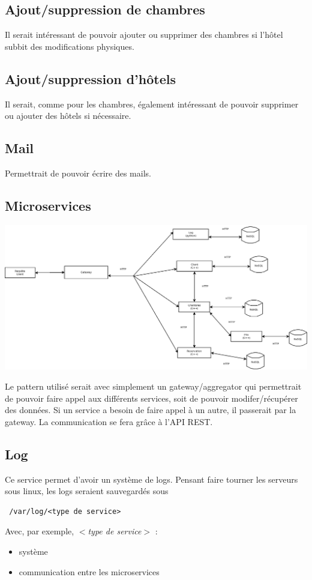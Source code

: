 \documentclass{article}
\begin{document}
\subsection{Ajout/suppression de chambres}
Il serait int\'eressant de pouvoir ajouter ou supprimer des chambres si l'h\^{o}tel subbit des modifications physiques.


\subsection{Ajout/suppression d'h\^{o}tels}
Il serait, comme pour les chambres, \'egalement int\'eressant de pouvoir supprimer ou ajouter des h\^{o}tels si n\'ecessaire.


\subsection{Mail}
Permettrait de pouvoir \'ecrire des mails.

\pagebreak
\begin{landscape}
\section{Microservices}
	\centering
\includegraphics[width=18cm]{microservices.png} \\
\end{landscape}

\pagebreak
\vspace{1cm}
Le pattern utilis\'e serait avec simplement un gateway/aggregator qui permettrait de pouvoir faire appel aux diff\'erents services, soit de pouvoir modifer/r\'ecup\'erer des donn\'ees. Si un service a besoin de faire appel \`a un autre, il passerait par la gateway. La communication se fera gr\^{a}ce \`a l'API REST.

\subsection{Log}
Ce service permet d'avoir un syst\`eme de logs. Pensant faire tourner les serveurs sous linux, les logs seraient sauvegard\'es sous \begin{verbatim} /var/log/<type de service> \end{verbatim}
\leavevmode \linebreak[3]
Avec, par exemple, \textit{$<$type de service$>$} :
\begin{itemize}
	\item syst\`eme
	\item communication entre les microservices
\end{itemize}
\end{document}
